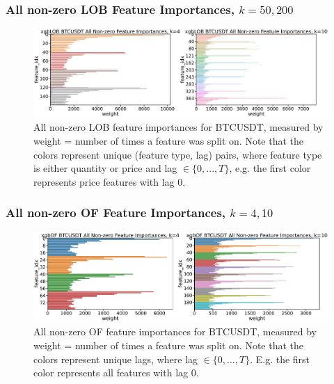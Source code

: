 \documentclass[handout]{beamer}
\begin{document}
\begin{frame}
    \frametitle{All non-zero LOB Feature Importances, $k=50, 200$}
        \begin{figure}[htpb!]
            \centering
            \includegraphics[width=1.0\textwidth]{./images/xgboost_LOB_BTCUSDT_all_feature_importances_1.pdf}
            \caption{All non-zero LOB feature importances for BTCUSDT, measured by weight = number of times a feature was split on.
            Note that the colors represent unique (feature type, lag) pairs, where feature type is either quantity or price and lag $\in \{0, ..., T\} $,
            e.g. the first color represents price features with lag 0.}
        \end{figure}
\end{frame}

\begin{frame}
    \frametitle{All non-zero OF Feature Importances, $k=4, 10$}
    \begin{figure}[htpb!]
        \centering
        \includegraphics[width=1.0\textwidth]{./images/xgboost_OF_BTCUSDT_all_feature_importances_1.pdf}
        \caption{All non-zero OF feature importances for BTCUSDT, measured by weight = number of times a feature was split on.
        Note that the colors represent unique lags, where lag $\in \{0, ..., T\} $. 
        E.g. the first color represents all features with lag 0.}
    \end{figure}
\end{frame}
\end{document}
